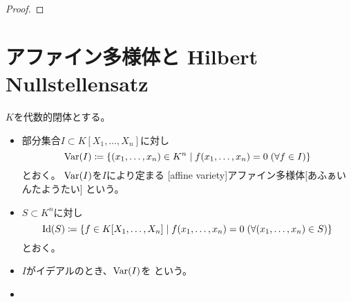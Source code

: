 \documentclass[report]{jlreq}
\begin{document}
\begin{proof}
    \TODO{}
\end{proof}




%
\section{アファイン多様体と Hilbert Nullstellensatz}


\begin{definition}[アファイン多様体]
    $K$を代数的閉体とする。
    \begin{itemize}
        \item 部分集合$I \subset K[X_1, \dots, X_n]$に対し
            \begin{equation}
                \operatorname{Var}(I) \coloneqq \{
                    (x_1, \dots, x_n) \in K^n
                    \mid
                    f(x_1, \dots, x_n) = 0
                    \; (\forall f \in I)
                \}
            \end{equation}
            とおく。
            $\operatorname{Var}(I)$を$I$により定まる
            [affine variety]{アファイン多様体}[あふぁいんたようたい]
            という。
        \item $S \subset K^n$に対し
            \begin{equation}
                \operatorname{Id}(S) \coloneqq \{
                    f \in K[X_1, \dots, X_n]
                    \mid
                    f(x_1, \dots, x_n) = 0
                    \; (\forall (x_1, \dots, x_n) \in S)
                \}
            \end{equation}
            とおく。
    \end{itemize}
\end{definition}

\begin{definition}
    \begin{itemize}
        \item $I$がイデアルのとき、$\operatorname{Var}(I)$を
            という。
        \item \TODO{}
    \end{itemize}
\end{definition}
\end{document}

